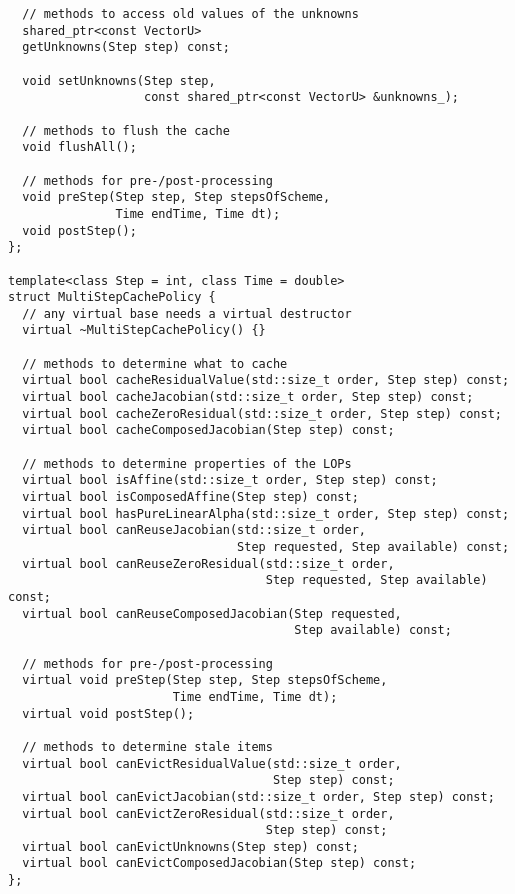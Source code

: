 \documentclass[11pt,a4paper,DIV11,%
notitlepage,oneside,abstracton,%
bibtotoc]{scrartcl}
\begin{document}
\begin{lstlisting}
  // methods to access old values of the unknowns
  shared_ptr<const VectorU>
  getUnknowns(Step step) const;

  void setUnknowns(Step step,
                   const shared_ptr<const VectorU> &unknowns_);

  // methods to flush the cache
  void flushAll();

  // methods for pre-/post-processing
  void preStep(Step step, Step stepsOfScheme,
               Time endTime, Time dt);
  void postStep();
};

template<class Step = int, class Time = double>
struct MultiStepCachePolicy {
  // any virtual base needs a virtual destructor
  virtual ~MultiStepCachePolicy() {}

  // methods to determine what to cache
  virtual bool cacheResidualValue(std::size_t order, Step step) const;
  virtual bool cacheJacobian(std::size_t order, Step step) const;
  virtual bool cacheZeroResidual(std::size_t order, Step step) const;
  virtual bool cacheComposedJacobian(Step step) const;

  // methods to determine properties of the LOPs
  virtual bool isAffine(std::size_t order, Step step) const;
  virtual bool isComposedAffine(Step step) const;
  virtual bool hasPureLinearAlpha(std::size_t order, Step step) const;
  virtual bool canReuseJacobian(std::size_t order,
                                Step requested, Step available) const;
  virtual bool canReuseZeroResidual(std::size_t order,
                                    Step requested, Step available) const;
  virtual bool canReuseComposedJacobian(Step requested,
                                        Step available) const;

  // methods for pre-/post-processing
  virtual void preStep(Step step, Step stepsOfScheme,
                       Time endTime, Time dt);
  virtual void postStep();

  // methods to determine stale items
  virtual bool canEvictResidualValue(std::size_t order,
                                     Step step) const;
  virtual bool canEvictJacobian(std::size_t order, Step step) const;
  virtual bool canEvictZeroResidual(std::size_t order,
                                    Step step) const;
  virtual bool canEvictUnknowns(Step step) const;
  virtual bool canEvictComposedJacobian(Step step) const;
};
\end{lstlisting}
\end{document}

